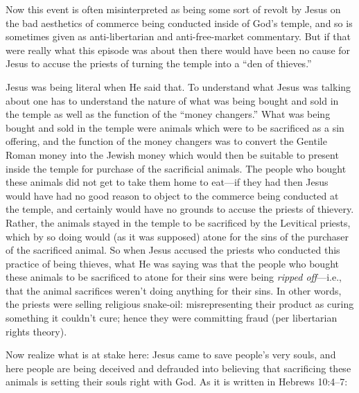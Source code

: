 \documentclass[letterpaper,12pt]{article}
\begin{document}
Now this event is often misinterpreted as being some sort of revolt by Jesus on the bad aesthetics of commerce being conducted inside of God's temple, and so is sometimes given as anti-libertarian and anti-free-market commentary. But if that were really what this episode was about then there would have been no cause for Jesus to accuse the priests of turning the temple into a ``den of thieves.''

Jesus was being literal when He said that. To understand what Jesus was talking about one has to understand the nature of what was being bought and sold in the temple as well as the function of the ``money changers.'' What was being bought and sold in the temple were animals which were to be sacrificed as a sin offering, and the function of the money changers was to convert the Gentile Roman money into the Jewish money which would then be suitable to present inside the temple for purchase of the sacrificial animals. The people who bought these animals did not get to take them home to eat---if they had then Jesus would have had no good reason to object to the commerce being conducted at the temple, and certainly would have no grounds to accuse the priests of thievery. Rather, the animals stayed in the temple to be sacrificed by the Levitical priests, which by so doing would (as it was supposed) atone for the sins of the purchaser of the sacrificed animal. So when Jesus accused the priests who conducted this practice of being thieves, what He was saying was that the people who bought these animals to be sacrificed to atone for their sins were being \emph{ripped off}---i.e., that the animal sacrifices weren't doing anything for their sins. In other words, the priests were selling religious snake-oil: misrepresenting their product as curing something it couldn't cure; hence they were committing fraud (per libertarian rights theory).

Now realize what is at stake here: Jesus came to save people's very souls, and here people are being deceived and defrauded into believing that sacrificing these animals is setting their souls right with God. As it is written in Hebrews 10:4--7:
\end{document}
